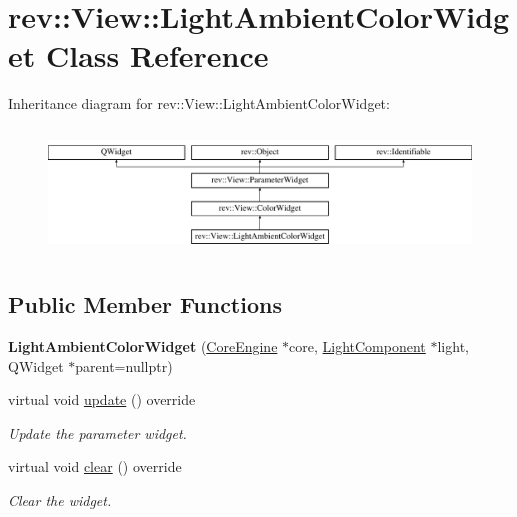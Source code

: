 \hypertarget{classrev_1_1_view_1_1_light_ambient_color_widget}{}\section{rev\+::View\+::Light\+Ambient\+Color\+Widget Class Reference}
\label{classrev_1_1_view_1_1_light_ambient_color_widget}
Inheritance diagram for rev\+::View\+::Light\+Ambient\+Color\+Widget\+:\begin{figure}[H]
\begin{center}
\leavevmode
\includegraphics[height=3.393939cm]{classrev_1_1_view_1_1_light_ambient_color_widget}
\end{center}
\end{figure}
\subsection*{Public Member Functions}
\begin{DoxyCompactItemize}
\item 
\mbox{\label{classrev_1_1_view_1_1_light_ambient_color_widget_a5894d7b2349a2a9e532dfb1e2ea1d4e6}} 
{\bfseries Light\+Ambient\+Color\+Widget} (\mbox{\hyperlink{classrev_1_1_core_engine}{Core\+Engine}} $\ast$core, \mbox{\hyperlink{classrev_1_1_light_component}{Light\+Component}} $\ast$light, Q\+Widget $\ast$parent=nullptr)
\item 
\mbox{\label{classrev_1_1_view_1_1_light_ambient_color_widget_a9590e2e769e004b5d583a6848d7754b0}} 
virtual void \mbox{\hyperlink{classrev_1_1_view_1_1_light_ambient_color_widget_a9590e2e769e004b5d583a6848d7754b0}{update}} () override
\begin{DoxyCompactList}\small\item\em Update the parameter widget. \end{DoxyCompactList}\item 
\mbox{\label{classrev_1_1_view_1_1_light_ambient_color_widget_abd30bb19ed4c7377e0a67ae25265065a}} 
virtual void \mbox{\hyperlink{classrev_1_1_view_1_1_light_ambient_color_widget_abd30bb19ed4c7377e0a67ae25265065a}{clear}} () override
\begin{DoxyCompactList}\small\item\em Clear the widget. \end{DoxyCompactList}\end{DoxyCompactItemize}

